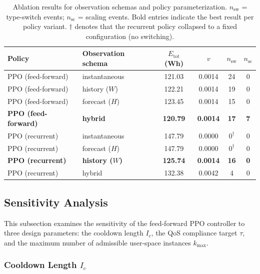 \documentclass[a4paper,fleqn]{cas-sc}
\begin{document}
\begin{table}[width=.9\linewidth,cols=6,pos=h]
\centering
\caption{Ablation results for observation schemas and policy parameterization. $n_{\mathrm{sw}}$ = type-switch events; $n_{\mathrm{sc}}$ = scaling events. Bold entries indicate the best result per policy variant. $\dagger$ denotes that the recurrent policy collapsed to a fixed configuration (no switching).}
\label{tab:ablation_obs}
\begin{tabular}{l l c c c c}
\hline
Policy & Observation schema & $E_{\mathrm{tot}}$ (Wh) & $v$ & $n_{\mathrm{sw}}$ & $n_{\mathrm{sc}}$ \\
\hline
PPO (feed-forward) & instantaneous    & 121.03 & 0.0014 & 24 & 0 \\
PPO (feed-forward) & history ($W$)    & 122.21 & 0.0014 & 19 & 0 \\
PPO (feed-forward) & forecast ($H$)   & 123.45 & 0.0014 & 15 & 0 \\
\textbf{PPO (feed-forward)} & \textbf{hybrid} & \textbf{120.79} & \textbf{0.0014} & \textbf{17} & \textbf{7} \\
\hline
PPO (recurrent) & instantaneous       & 147.79 & 0.0000 & $0^\dagger$ & 0 \\
PPO (recurrent) & forecast ($H$)      & 147.79 & 0.0000 & $0^\dagger$ & 0 \\
\textbf{PPO (recurrent)} & \textbf{history ($W$)} & \textbf{125.74} & \textbf{0.0014} & \textbf{16} & \textbf{0} \\
PPO (recurrent) & hybrid              & 132.38 & 0.0042 & 4 & 0 \\
\hline
\end{tabular}
\end{table}

\subsection{Sensitivity Analysis}
\label{subsec:sensitivity}

This subsection examines the sensitivity of the feed-forward PPO controller to three design parameters: the cooldown length $I_c$, the QoS compliance target $\tau$, and the maximum number of admissible user-space instances $k_{\max}$.

\subsubsection{Cooldown Length $I_c$}
\label{subsubsec:sensitivity_ic}
\end{document}
